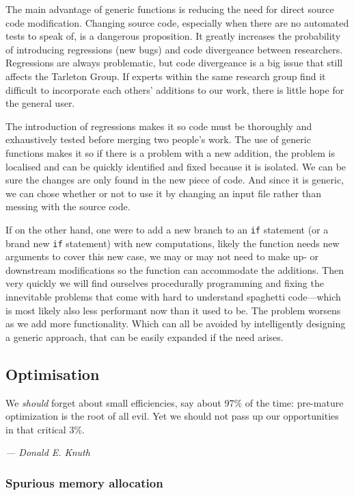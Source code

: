 The main advantage of generic functions is reducing the need for direct source code modification. Changing source code, especially when there are no automated tests to speak of, is a dangerous proposition. It greatly increases the probability of introducing regressions (new bugs) and code divergeance between researchers. Regressions are always problematic, but code divergeance is a big issue that still affects the Tarleton Group. If experts within the same research group find it difficult to incorporate each others' additions to our work, there is little hope for the general user.

The introduction of regressions makes it so code must be thoroughly and exhaustively tested before merging two people's work. The use of generic functions makes it so if there is a problem with a new addition, the problem is localised and can be quickly identified and fixed because it is isolated. We can be sure the changes are only found in the new piece of code. And since it is generic, we can chose whether or not to use it by changing an input file rather than messing with the source code.

If on the other hand, one were to add a new branch to an \texttt{if} statement (or a brand new \texttt{if} statement) with new computations, likely the function needs new arguments to cover this new case, we may or may not need to make up- or downstream modifications so the function can accommodate the additions. Then very quickly we will find ourselves procedurally programming and fixing the innevitable problems that come with hard to understand spaghetti code---which is most likely also less performant now than it used to be. The problem worsens as we add more functionality. Which can all be avoided by intelligently designing a generic approach, that can be easily expanded if the need arises.

\subsection{Optimisation}
\renewcommand{\epigraphflush}{flushright}
\renewcommand{\textflush}{flushright}
\setlength{\epigraphwidth}{0.75\linewidth}
\epigraph{We \emph{should} forget about small efficiencies, say about 97\% of the time: pre-mature optimization is the root of all evil. Yet we should not pass up our opportunities in that critical 3\%.}{\textit{--- Donald E. Knuth \cite[p.~268]{knuth1974structured}}}

\subsubsection{Spurious memory allocation}

